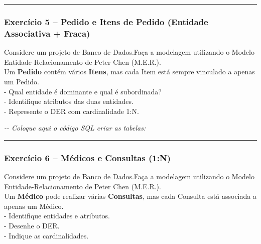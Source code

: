 \documentclass[
]{book}
\newenvironment{Shaded}{\begin{snugshade}}{\end{snugshade}}
\newcommand{\CommentTok}[1]{\textcolor[rgb]{0.56,0.35,0.01}{\textit{#1}}}
\begin{document}
\begin{center}\rule{0.5\linewidth}{0.5pt}\end{center}

\subsubsection{Exercício 5 -- Pedido e Itens de Pedido (Entidade Associativa + Fraca)}\label{exercuxedcio-5-pedido-e-itens-de-pedido-entidade-associativa-fraca}

Considere um projeto de Banco de Dados.Faça a modelagem utilizando o Modelo Entidade-Relacionamento de Peter Chen (M.E.R.).\\
Um \textbf{Pedido} contém vários \textbf{Itens}, mas cada Item está sempre vinculado a apenas um Pedido.\\
- Qual entidade é dominante e qual é subordinada?\\
- Identifique atributos das duas entidades.\\
- Represente o DER com cardinalidade 1:N.



\begin{Shaded}
\begin{Highlighting}[]
\CommentTok{{-}{-} Coloque aqui o código SQL criar as tabelas:}


\end{Highlighting}
\end{Shaded}

\begin{center}\rule{0.5\linewidth}{0.5pt}\end{center}

\subsubsection{Exercício 6 -- Médicos e Consultas (1:N)}\label{exercuxedcio-6-muxe9dicos-e-consultas-1n}

Considere um projeto de Banco de Dados.Faça a modelagem utilizando o Modelo Entidade-Relacionamento de Peter Chen (M.E.R.).\\
Um \textbf{Médico} pode realizar várias \textbf{Consultas}, mas cada Consulta está associada a apenas um Médico.\\
- Identifique entidades e atributos.\\
- Desenhe o DER.\\
- Indique as cardinalidades.


\end{document}
